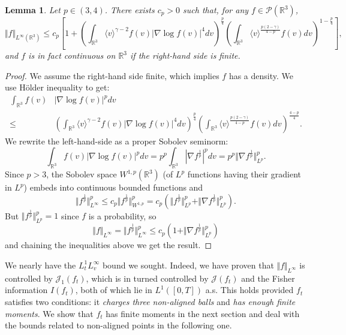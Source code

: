 \documentclass[11pt,a4paper]{article}
\theoremstyle{definition}
\theoremstyle{plain}
\newtheorem{lemma}[defi]{Lemma}
\newcommand{\jap}[1]{\langle #1 \rangle}
\begin{document}
\begin{lemma}
    \label{lem:fisher4controlsLinf}
    Let $p\in (3,4)$. There exists $c_p>0$ such that, for any $f\in\mathcal{P}(\mathbb{R}^3)$, 
    $$\Vert f\Vert_{L^\infty(\mathbb{R}^3)} \leq c_p\left[1+\left( \int_{\mathbb{R}^{3}}\jap{v}^{\gamma-2}f(v) \left\vert\nabla\log f(v) \right\vert^{4} dv \right)^{\frac{p}{4}}\left(\int_{\mathbb{R}^{3}}\jap{v}^{\frac{p(2-\gamma)}{4-p}}f(v)  dv\right)^{1-\frac{p}{4}}\right],$$
    and $f$ is in fact continuous on $\mathbb{R}^3$ if the right-hand side is finite.
\end{lemma}
\begin{proof}
We assume the right-hand side finite, which implies $f$ has a density.
We use Hölder inequality to get:
\begin{align*}
\int_{\mathbb{R}^{3}}f(v) &\left\vert\nabla\log f(v) \right\vert^{p} dv\\\leq
&\left( \int_{\mathbb{R}^{3}}\jap{v}^{\gamma-2}f(v) \left\vert\nabla\log f(v) \right\vert^{4} dv \right)^{\frac{p}{4}}\left(\int_{\mathbb{R}^{3}}\jap{v}^{\frac{p(2-\gamma)}{4-p}}f(v)  dv\right)^{\frac{4-p}{4}}.
\end{align*}
We rewrite the left-hand-side as a proper Sobolev seminorm:
$$\int_{\mathbb{R}^{3}}f(v) \left\vert\nabla\log f(v) \right\vert^{p} dv=p^p \int_{\mathbb{R}^{3}} \left\vert\nabla f^\frac{1}{p} \right\vert^{p} dv=p^p\Vert \nabla f^\frac{1}{p}\Vert_{L^p}^p.$$
Since $p>3$, the Sobolev space $W^{1,p}(\mathbb{R}^3)$ (of $L^p$ functions having their gradient in $L^p$) embeds into continuous bounded functions and
$$\Vert f^\frac{1}{p}\Vert_{L^\infty}^p\leq c_p \Vert f^\frac{1}{p}\Vert_{W^{1,p}}^p=c_p\left(\Vert f^\frac{1}{p}\Vert^p_{L^p}+\Vert \nabla f^\frac{1}{p}\Vert_{L^p}^p\right).$$
But $\Vert f^\frac{1}{p}\Vert^p_{L^p}=1$ since $f$ is a probability, so 
$$\Vert f\Vert_{L^\infty}=\Vert f^\frac{1}{p}\Vert_{L^\infty}^p \leq c_p\left(1+\Vert \nabla f^\frac{1}{p}\Vert_{L^p}^p\right)$$
and chaining the inequalities above we get the result.
\end{proof}
We nearly have the $L^1_t L^\infty_v$
bound we sought. 
Indeed, we have proven that $\Vert f\Vert_{L^\infty}$ is controlled by $\mathcal{J}_1(f_t)$, which is in turned controlled by $\mathcal{J}(f_t)$ and the Fisher information $I(f_t)$, both of which lie in $L^1([0,T])$ a.s. This holds provided $f_t$ satisfies two conditions: it \textit{charges three non-aligned balls} and \textit{has enough finite moments}. We show that $f_t$ has finite moments in the next section and deal with the bounds related to non-aligned points in the following one.
\end{document}
